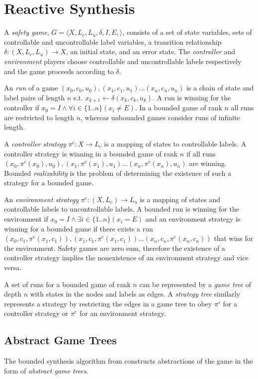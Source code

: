 \documentclass{llncs}
\begin{document}
\section{Reactive Synthesis}

A \emph{safety game}, $G = \langle X, L_c, L_u, \delta, I, E, \rangle$,
consists of a set of state variables, sets of controllable and uncontrollable
label variables, a transition relationship $\delta : (X, L_c, L_u) \to X$, an
initial state, and an error state. The \emph{controller} and \emph{environment}
players choose controllable and uncontrollable labels respectively and the game
proceeds according to $\delta$. 

An \emph{run} of a game $(x_0, c_0, u_0), (x_1, c_1, u_1) \dots (x_n, c_n,
u_n)$ is a chain of state and label pairs of length $n$ s.t.  $x_{k+1}
\leftarrow \delta(x_k, c_k, u_k)$. A run is winning for the controller if $x_0
= I \land \forall i \in \{1..n\} (x_i \neq E)$. In a bounded game of rank $n$
all runs are restricted to length $n$, whereas unbounded games consider runs of
infinite length.

A \emph{controller strategy} $\pi^c : X \to L_c$ is a mapping of states to
controllable labels. A controller strategy is winning in a bounded game of rank
$n$ if all runs $(x_0, \pi^c(x_0), u_0), (x_1, \pi^c(x_1), u_1) \dots (x_n,
\pi^c(x_n), u_n)$ are winning. Bounded \emph{realizability} is the problem of
determining the existence of such a strategy for a bounded game.

An \emph{environment strategy} $\pi^e : (X, L_c) \to L_u$ is a mapping of
states and controllable labels to uncontrollable labels. A bounded run is
winning for the environment if $x_0 = I \land \exists i \in \{1..n\} (x_i = E)$
and an environment strategy is winning for a bounded game if there exists a run
$(x_0, c_1, \pi^e(x_1, c_1)), (x_1, c_1, \pi^e(x_1, c_1)) \dots (x_n, c_n,
\pi^e(x_n, c_n))$ that wins for the environment. Safety games are zero sum,
therefore the existence of a controller strategy implies the nonexistence of an
environment strategy and vice versa.

A set of runs for a bounded game of rank $n$ can be represented by a \emph{game
tree} of depth $n$ with states in the nodes and labels as edges. A
\emph{strategy tree} similarly represents a strategy by restricting the edges
in a game tree to obey $\pi^c$ for a controller strategy or $\pi^e$ for an
environment strategy.

\subsection{Abstract Game Trees}

The bounded synthesis algorithm from \cite{nina} constructs abstractions of the
game in the form of \emph{abstract game trees}. 
\end{document}
